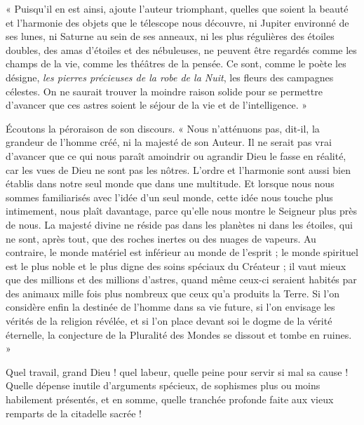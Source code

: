 \documentclass[a4paper, 11pt, oneside, landscape]{article}
\begin{document}
« Puisqu'il en est ainsi, ajoute l'auteur triomphant, quelles que soient la beauté et l'harmonie des objets que le télescope nous découvre, ni Jupiter environné de ses lunes, ni Saturne au sein de ses anneaux, ni les plus régulières des étoiles doubles, des amas d'étoiles et des nébuleuses, ne peuvent être regardés comme les champs de la vie, comme les théâtres de la pensée. Ce sont, comme le poète les désigne, \emph{les pierres précieuses de la robe de la Nuit}, les fleurs des campagnes célestes. On ne saurait trouver la moindre raison solide pour se permettre d'avancer que ces astres soient le séjour de la vie et de l'intelligence. »

Écoutons la péroraison de son discours. « Nous n'atténuons pas, dit-il, la grandeur de l'homme créé, ni la majesté de son Auteur. Il ne serait pas vrai d'avancer que ce qui nous paraît amoindrir ou agrandir Dieu le fasse en réalité, car les vues de Dieu ne sont pas les nôtres. L'ordre et l'harmonie sont aussi bien établis dans notre seul monde que dans une multitude. Et lorsque nous nous sommes familiarisés avec l'idée d'un seul monde, cette idée nous touche plus intimement, nous plaît davantage, parce qu'elle nous montre le Seigneur plus près de nous. La majesté divine ne réside pas dans les planètes ni dans les étoiles, qui ne sont, après tout, que des roches inertes ou des nuages de vapeurs. Au contraire, le monde matériel est inférieur au monde de l'esprit ; le monde spirituel est le plus noble et le plus digne des soins spéciaux du Créateur ; il vaut mieux que des millions et des millions d'astres, quand même ceux-ci seraient habités par des animaux mille fois plus nombreux que ceux qu'a produits la Terre. Si l'on considère enfin la destinée de l'homme dans sa vie future, si l'on envisage les vérités de la religion révélée, et si l'on place devant soi le dogme de la vérité éternelle, la conjecture de la Pluralité des Mondes se dissout et tombe en ruines. »

Quel travail, grand Dieu ! quel labeur, quelle peine pour servir si mal sa cause ! Quelle dépense inutile d'arguments spécieux, de sophismes plus ou moins habilement présentés, et en somme, quelle tranchée profonde faite aux vieux remparts de la citadelle sacrée !
\end{document}

